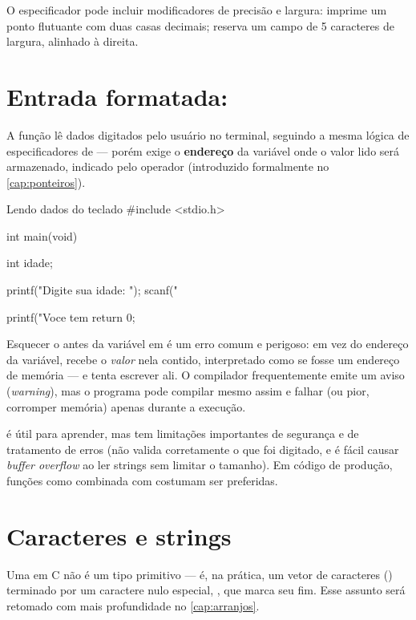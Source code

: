 O especificador pode incluir modificadores de precisão e largura:  imprime um ponto flutuante com duas casas decimais;  reserva um campo de 5 caracteres de largura, alinhado à direita.

\section{Entrada formatada: }

A função  lê dados digitados pelo usuário no terminal, seguindo a mesma lógica de especificadores de  — porém exige o \textbf{endereço} da variável onde o valor lido será armazenado, indicado pelo operador \code{\&} (introduzido formalmente no \cref{cap:ponteiros}).

\begin{codigoc}{Lendo dados do teclado}
#include <stdio.h>

int main(void) {
    int idade;

    printf("Digite sua idade: ");
    scanf("%

    printf("Voce tem %
    return 0;
}
\end{codigoc}

\begin{atencao}
Esquecer o \code{\&} antes da variável em  é um erro comum e perigoso: em vez do endereço da variável,  recebe o \emph{valor} nela contido, interpretado como se fosse um endereço de memória — e tenta escrever ali. O compilador frequentemente emite um aviso (\emph{warning}), mas o programa pode compilar mesmo assim e falhar (ou pior, corromper memória) apenas durante a execução.
\end{atencao}

\begin{dica}
 é útil para aprender, mas tem limitações importantes de segurança e de tratamento de erros (não valida corretamente o que foi digitado, e é fácil causar \emph{buffer overflow} ao ler strings sem limitar o tamanho). Em código de produção, funções como  combinada com  costumam ser preferidas.
\end{dica}

\section{Caracteres e strings}

Uma  em C não é um tipo primitivo — é, na prática, um vetor de caracteres () terminado por um caractere nulo especial, , que marca seu fim. Esse assunto será retomado com mais profundidade no \cref{cap:arranjos}.

